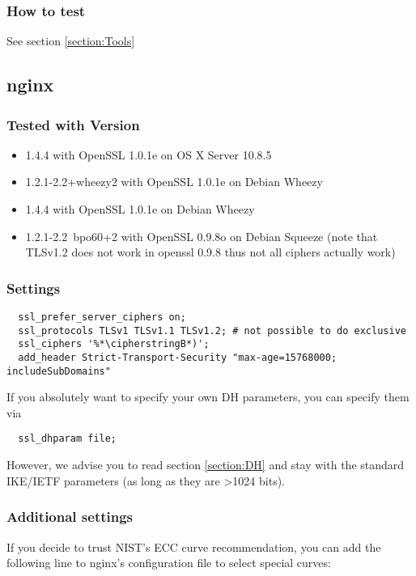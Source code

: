 \subsubsection{How to test} 
See section \ref{section:Tools}

\subsection{nginx}


\subsubsection{Tested with Version} 
\begin{itemize}
  \item 1.4.4 with OpenSSL 1.0.1e on OS X Server 10.8.5
  \item 1.2.1-2.2+wheezy2 with OpenSSL 1.0.1e on Debian Wheezy
  \item 1.4.4 with OpenSSL 1.0.1e on Debian Wheezy
  \item 1.2.1-2.2~bpo60+2 with OpenSSL 0.9.8o on Debian Squeeze (note that TLSv1.2 does not work in openssl 0.9.8 thus not all ciphers actually work)
\end{itemize}


\subsubsection{Settings}
\begin{lstlisting}
  ssl_prefer_server_ciphers on;
  ssl_protocols TLSv1 TLSv1.1 TLSv1.2; # not possible to do exclusive
  ssl_ciphers '%*\cipherstringB*)';
  add_header Strict-Transport-Security "max-age=15768000; includeSubDomains"
\end{lstlisting}

If you absolutely want to specify your own DH parameters, you can specify them via
\begin{lstlisting}
  ssl_dhparam file;
\end{lstlisting}

However, we advise you to read section \ref{section:DH} and stay with the standard IKE/IETF parameters (as long as they are \textgreater 1024 bits).


\subsubsection{Additional settings}
If you decide to trust NIST's ECC curve recommendation, you can add the following line to nginx's configuration file to select special curves:

